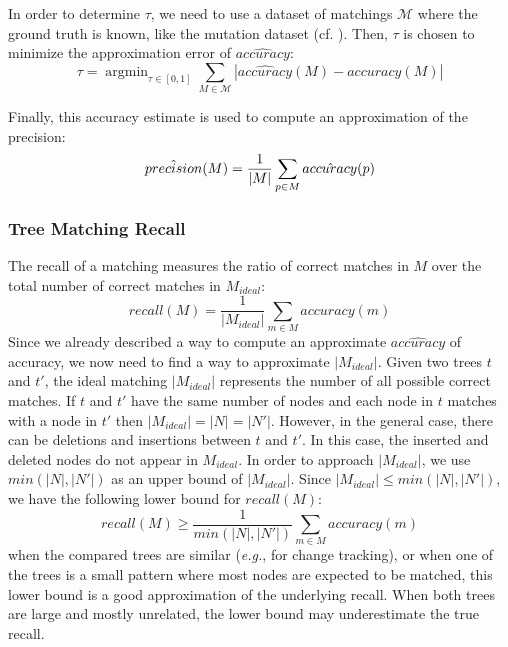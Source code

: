 \documentclass{vldb}
\DeclareMathOperator*{\argmin}{argmin}
\begin{document}
In order to determine $\tau$, we need to use a dataset of matchings $\mathscr{M}$ where the ground truth is known, like the mutation dataset (cf. ).
Then, $\tau$ is chosen to minimize the approximation error of $\hat{accuracy}$:
\begin{equation}
  \tau = \argmin_{\tau \in [0, 1]}\sum_{M \in \mathscr{M}}|\hat{accuracy}(M) - accuracy(M)|
\end{equation}

Finally, this accuracy estimate is used to compute an approximation of the precision:
\begin{equation}
    \hat{precision}(M) = \frac{1}{|M|}\sum_{p \in M}\hat{accuracy}(p) \\
\end{equation}

\subsubsection{Tree Matching Recall}
The recall of a matching measures the ratio of correct matches in $M$ over the total number of correct matches in $M_{ideal}$:
\begin{equation}
    recall(M) = \frac{1}{|M_{ideal}|} \sum_{m \in M} accuracy(m)
\end{equation}
Since we already described a way to compute an approximate $\hat{accuracy}$ of accuracy, we now need to find a way to approximate $|M_{ideal}|$.
Given two trees $t$ and $t'$, the ideal matching $|M_{ideal}|$ represents the number of all possible correct matches.
If $t$ and $t'$ have the same number of nodes and each node in $t$ matches with a node in $t'$ then $|M_{ideal}| = |N| = |N'|$.
However, in the general case, there can be deletions and insertions between $t$ and $t'$. 
In this case, the inserted and deleted nodes do not appear in $M_{ideal}$.
In order to approach $|M_{ideal}|$, we use $min(|N|,|N'|)$ as an upper bound of $|M_{ideal}|$.
Since $|M_{ideal}| \leq min(|N|, |N'|)$, we have the following lower bound for $recall(M)$:
\begin{equation}
    recall(M) \geq \frac{1}{min(|N|, |N'|)} \sum_{m \in M} accuracy(m)
\end{equation}
when the compared trees are similar (\emph{e.g.}, for change tracking), or when one of the trees is a small pattern where most nodes are expected to be matched, this lower bound is a good approximation of the underlying recall.
When both trees are large and mostly unrelated, the lower bound may underestimate the true recall.
\end{document}
